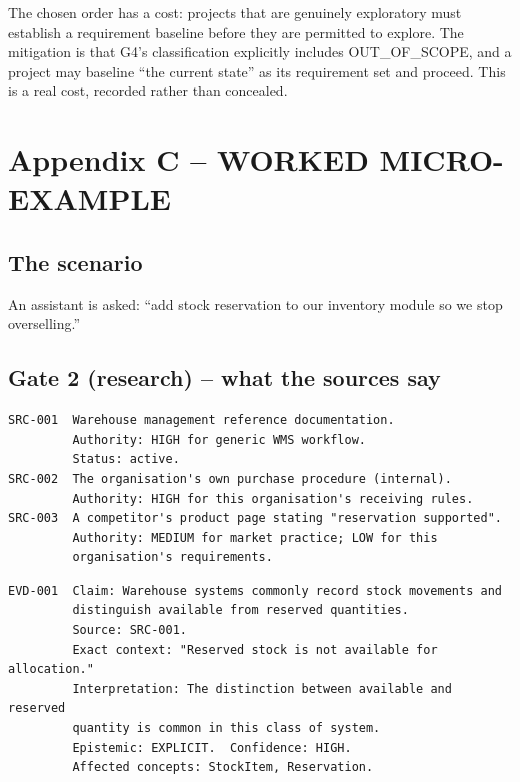 \documentclass[11pt,a4paper]{article}
\begin{document}
The chosen order has a cost: projects that are genuinely exploratory must establish a requirement baseline before they are permitted to explore. The mitigation is that G4's classification explicitly includes OUT\_OF\_SCOPE, and a project may baseline ``the current state'' as its requirement set and proceed. This is a real cost, recorded rather than concealed.

\section{Appendix C -- WORKED MICRO-EXAMPLE}

\subsection{The scenario}

An assistant is asked: ``add stock reservation to our inventory module so we stop overselling.''

\subsection{Gate 2 (research) -- what the sources say}

\begin{Verbatim}[fontsize=\footnotesize,breaklines=true,breakanywhere=true,breakautoindent=false,samepage=false]
SRC-001  Warehouse management reference documentation.
         Authority: HIGH for generic WMS workflow.
         Status: active.
SRC-002  The organisation's own purchase procedure (internal).
         Authority: HIGH for this organisation's receiving rules.
SRC-003  A competitor's product page stating "reservation supported".
         Authority: MEDIUM for market practice; LOW for this
         organisation's requirements.
\end{Verbatim}

\begin{Verbatim}[fontsize=\footnotesize,breaklines=true,breakanywhere=true,breakautoindent=false,samepage=false]
EVD-001  Claim: Warehouse systems commonly record stock movements and
         distinguish available from reserved quantities.
         Source: SRC-001.
         Exact context: "Reserved stock is not available for allocation."
         Interpretation: The distinction between available and reserved
         quantity is common in this class of system.
         Epistemic: EXPLICIT.  Confidence: HIGH.
         Affected concepts: StockItem, Reservation.
\end{Verbatim}
\end{document}
